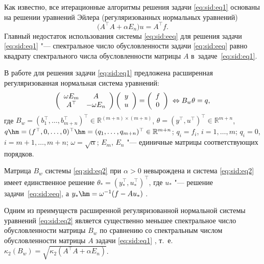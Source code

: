 Как известно, все итерационные алгоритмы решения задачи \eqref{eq:sid:eq1} основаны на решении уравнений Эйлера (регуляризованных нормальных уравнений)
\begin{equation}
\label{eq:sid:eeq}
\bigl(A^\top  A+\alpha E_n\bigr)u=A^\top  f.
\end{equation}  
Главный недостаток использования системы \eqref{eq:sid:eeq} для решения задачи \eqref{eq:sid:eq1} 
"--- спектральное число обусловленности задачи \eqref{eq:sid:eeq} равно квадрату спектрального числа обусловленности матрицы $A$ в~задаче~\eqref{eq:sid:eq1}.
  
В работе \cite{zhdanovsid:bib:Zhdanov} для решения задачи \eqref{eq:sid:eq1} предложена расширенная регуляризованная нормальная система уравнений:
\begin{equation}
\label{eq:sid:eq2}
\left(
\begin{array}{c c}
\omega E_m & A\\
A^\top  & -\omega E_n\\
\end{array}
\right)
\left(
\begin{array}{c}
y\\
u\\
\end{array}
\right)
=\left(
\begin{array}{c}
f\\
0\\
\end{array}
\right)
\;
\Leftrightarrow
B_w \theta = q, 
\end{equation} 
где $B_w = \left(b^{\top}_1 , \dots, b^{\top}_{m+n} \right)^\top \in \mathbb{R}^{\left(m+n\right)\times \left(m+n\right)}$, 
$\theta = \left(y^\top, u^\top \right)^\top \in \mathbb{R}^{m+n}$, $q\hm =(f^\top, 0, \ldots , 0 )^\top \hm =(q_1, \dots, q_{m+n} )^\top  \in \mathbb{R}^{m+n}$; 
$q_i=f_i$, $i=1, \dots, m$; $q_i=0$, $i=m+1, \dots, m+n$; $\omega = \sqrt{\alpha}$; $E_m$, $E_n$ "--- единичные матрицы соответствующих порядков.

Матрица $B_w$ системы \eqref{eq:sid:eq2} при $\alpha>0$ невырождена и система \eqref{eq:sid:eq2} имеет единственное решение $\theta_{*}=(y_{*}^\top , u_{*}^\top )^\top $, 
где $u_*$ "--- решение задачи~\eqref{eq:sid:eeq}, а $y_* \hm  = \omega^{-1}(f-Au_*)$ \cite{zhdanovsid:bib:Zhdanov}.

Одним из преимуществ расширенной регуляризованной нормальной системы уравнений \eqref{eq:sid:eq2} является существенно меньшее спектральное число обусловленности матрицы $B_w$ по сравнению со спектральным числом обусловленности матрицы $A$ задачи \eqref{eq:sid:eq1} \cite{zhdanovsid:bib:Zhdanov}, т.~е. $\kappa_2\left(B_w\right)=\sqrt{\kappa_2\left(A^\top A+\alpha E_n\right)}$.

